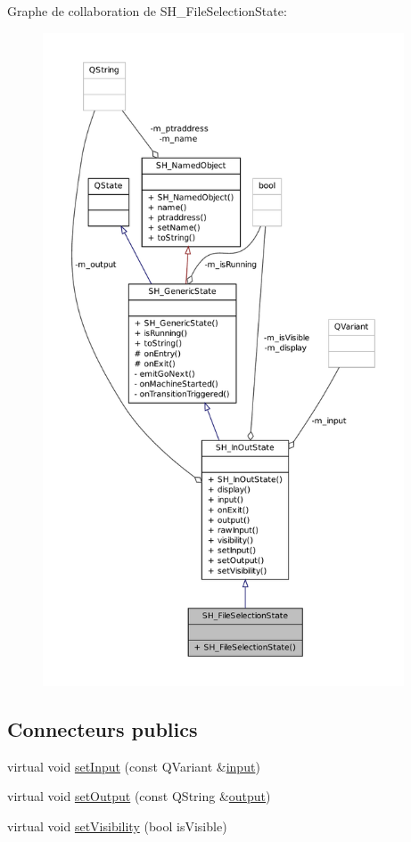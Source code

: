 Graphe de collaboration de S\-H\-\_\-\-File\-Selection\-State\-:
\nopagebreak
\begin{figure}[H]
\begin{center}
\leavevmode
\includegraphics[height=550pt]{classSH__FileSelectionState__coll__graph}
\end{center}
\end{figure}
\subsection*{Connecteurs publics}
\begin{DoxyCompactItemize}
\item 
virtual void \hyperlink{classSH__InOutState_aaec9c2b5ef7c406bff7469461352d47c}{set\-Input} (const Q\-Variant \&\hyperlink{classSH__InOutState_a8e1b78069343122df7713624a1a5a100}{input})
\item 
virtual void \hyperlink{classSH__InOutState_af611c84134e262739cd834797b315c80}{set\-Output} (const Q\-String \&\hyperlink{classSH__InOutState_a17ed7eaf5e3ed5af80a4f9fe65d5bfd9}{output})
\item 
virtual void \hyperlink{classSH__InOutState_a7fdfaa6f600f0ac4a96f238a038ba9ad}{set\-Visibility} (bool is\-Visible)
\end{DoxyCompactItemize}
